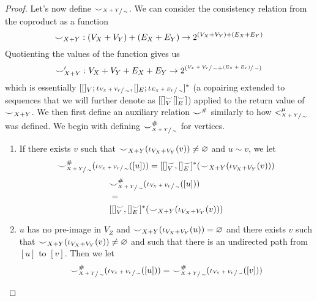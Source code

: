 \begin{proof}
    Let's now define ${\smile}_{\sfrac{X+Y}{\sim}}$.
    We can consider the consistency relation from the coproduct as a function 
    \[
        {\smile}_{X+Y} : (V_{X} + V_{Y}) + (E_{X} + E_{Y}) \to 2^{(V_{X} + V_{Y}) + (E_{X} + E_{Y})}
    \]
    Quotienting the values of the function gives us 
    \[
        {\smile}_{X+Y}' : V_{X} + V_{Y} + E_{X} + E_{Y} \to 2^{(\sfrac{V_{X} + V_{Y}}{\sim} + \sfrac{(E_{X} + E_{Y})}{\sim})}
     \]
    which is essentially $[ []_{V};\iota_{\sfrac{V_{X} + V_{Y}}{\sim}}, []_{E};\iota_{\sfrac{E_{X} + E_{Y}}{\sim}}]^{*}$ (a copairing extended to sequences that we will further denote as $[ []_{V}^{{\smile}} []_{E}^{{\smile}}]$) applied to the return value of ${\smile}_{X+Y}$.
    We then first define an auxiliary relation ${\smile}^{{\#}}$ similarly to how $<^{\mu}_{\sfrac{X+Y}{\sim}}$ was defined. We begin with defining ${\smile}^{{\#}}_{\sfrac{X+Y}{\sim}}$ for vertices.

    \begin{enumerate}
        \item If there exists $v$ such that ${\smile}_{X+Y}(\iota_{V_{X} + V_{Y}}(v)) \not = \varnothing$ and $u \sim v$, we let
              \ifdefined \ONECOLUMN
              \[
                {\smile}_{\sfrac{X+Y}{\sim}}^{{\#}}(\iota_{\sfrac{V_{X} + V_{Y}}{\sim}}([u]))
                =
                [[]_{V}^{{\smile}},[]_{E}^{{\smile}}]^{*}({\smile}_{X+Y}(\iota_{V_{X} + V_{Y}}(v)))
              \]
              \else
              \begin{align*}
                &{\smile}_{\sfrac{X+Y}{\sim}}^{{\#}}(\iota_{\sfrac{V_{X} + V_{Y}}{\sim}}([u]))\\
                &=\\
                &[[]_{V}^{{\smile}},[]_{E}^{{\smile}}]^{*}({\smile}_{X+Y}(\iota_{V_{X} + V_{Y}}(v)))
            \end{align*}
            \fi
        \item $u$ has no pre-image in $V_{Z}$ and ${\smile}_{X+Y}(\iota_{V_{X} + V_{Y}}(u)) = \varnothing$ and there exists $v$ such that ${\smile}_{X+Y}(\iota_{V_{X} + V_{Y}}(v)) \not = \varnothing$ and such that there is an undirected path from $[u]$ to $[v]$.
        Then we let
        \[
            {\smile}_{\sfrac{X+Y}{\sim}}^{{\#}}(\iota_{\sfrac{V_{X} + V_{Y}}{\sim}}([u])) = {\smile}_{\sfrac{X+Y}{\sim}}^{{\#}}(\iota_{\sfrac{V_{X} + V_{Y}}{\sim}}([v]))
        \]
    \end{enumerate}


\end{proof}
